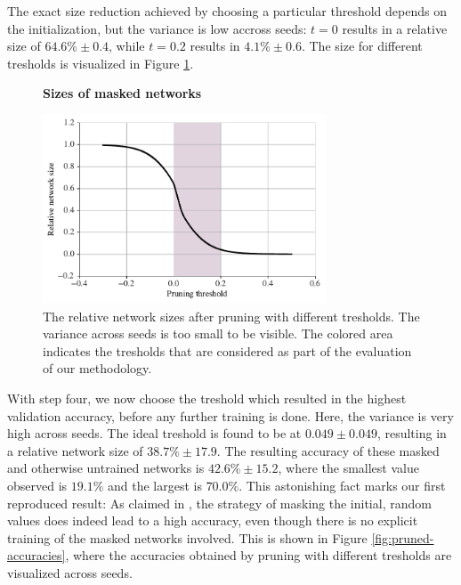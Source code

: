 \documentclass[12pt,final,twoside]{article}
\theoremstyle{plain}
\theoremstyle{definition}
\theoremstyle{remark}
\theoremstyle{named}
\begin{document}
The exact size reduction achieved by choosing a particular threshold depends on the initialization, but the variance is low accross seeds: $t=0$ results in a relative size of $64.6\% \pm 0.4$, while $t=0.2$ results in $4.1\% \pm 0.6$. The size for different tresholds is visualized in Figure \ref{fig:pruned-sizes}.

\begin{figure}[h]
  \centering
  \textbf{Sizes of masked networks}\par\medskip
  \includegraphics[width=0.75\textwidth]{plots/pruned_sizes.pdf}
  \caption{The relative network sizes after pruning with different tresholds. The variance across seeds is too small to be visible. The colored area indicates the tresholds that are considered as part of the evaluation of our methodology. }
  \label{fig:pruned-sizes}
\end{figure}

With step four, we now choose the treshold which resulted in the highest validation accuracy, before any further training is done. Here, the variance is very high across seeds. The ideal treshold is found to be at $0.049 \pm 0.049$, resulting in a relative network size of $38.7\% \pm 17.9$. The resulting accuracy of these masked and otherwise untrained networks is $42.6\% \pm 15.2$, where the smallest value observed is $19.1\%$ and the largest is $70.0\%$. This astonishing fact marks our first reproduced result: As claimed in \cite{supermask}, the strategy of masking the initial, random values does indeed lead to a high accuracy, even though there is no explicit training of the masked networks involved. This is shown in Figure \ref{fig:pruned-accuracies}, where the accuracies obtained by pruning with different tresholds are visualized across seeds.
\end{document}
